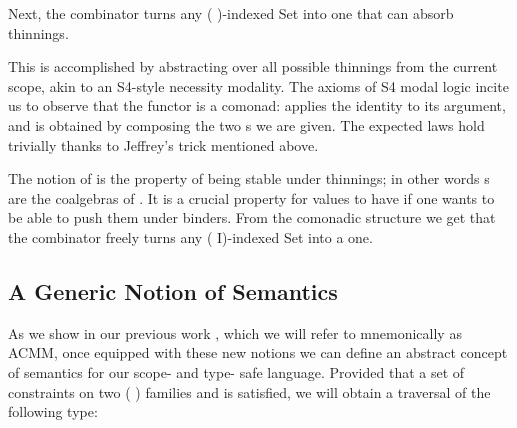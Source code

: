 Next, the  combinator turns any ( )-indexed Set into one that can
absorb thinnings.
\begin{center}
\begin{minipage}{0.45\textwidth}
\end{minipage}\hfill
\begin{minipage}{0.45\textwidth}
\end{minipage}

\begin{minipage}{0.25\textwidth}
\end{minipage}\hfill
\begin{minipage}{0.35\textwidth}
\end{minipage}\hfill
\begin{minipage}{0.30\textwidth}
\end{minipage}

\end{center}
This is accomplished by abstracting over all possible thinnings
from the current scope, akin to an S4-style necessity modality. The axioms of S4
modal logic incite us to observe that the functor  is a comonad: 
applies the identity  to its argument, and  is obtained
by composing the two s we are given. The expected laws hold trivially
thanks to Jeffrey's trick mentioned above.

The notion of  is the property of being stable under thinnings;
in other words s are the coalgebras of .
It is a crucial property for values to have if one wants to be able to push
them under binders. From the comonadic structure we get that
the  combinator freely turns any ( I)-indexed Set into a
 one.

\subsection{A Generic Notion of Semantics}

As we show in our previous work \cite{allais2017type}, which we will refer to mnemonically as ACMM, once
equipped with these new notions we can define an abstract concept
of semantics for our scope- and type- safe language. Provided that a set of
constraints on two ({ }) families  and  is
satisfied, we will obtain a traversal of the following type:

